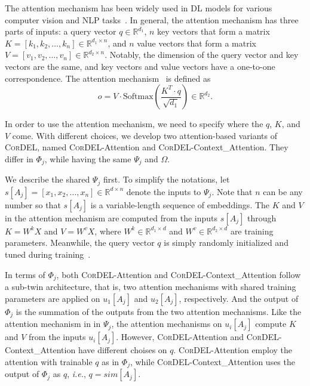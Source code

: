 \documentclass[conference]{IEEEtran}
\begin{document}
The attention mechanism has been widely used in DL models for various computer vision and NLP tasks~\cite{yang2016hierarchical,vaswani2017attention,wang2018non,devlin2019bert,wang2020non,wang2020icapsnets,liu2020global}. In general, the attention mechanism has three parts of inputs: a query vector $q \in \mathbb{R}^{d_1}$, $n$ key vectors that form a matrix $K=[k_1,k_2,\ldots,k_n] \in \mathbb{R}^{d_1 \times n}$, and $n$ value vectors that form a matrix $V=[v_1,v_2,\ldots,v_n] \in \mathbb{R}^{d_2 \times n}$. Notably, the dimension of the query vector and key vectors are the same, and key vectors and value vectors have a one-to-one correspondence. The attention mechanism~\cite{vaswani2017attention} is defined as
\begin{equation}
    o = V \cdot \text{Softmax}(\frac{K^T \cdot q}{\sqrt{d_1}}) \in \mathbb{R}^{d_2}.
\end{equation}

In order to use the attention mechanism, we need to specify where the $q$, $K$, and $V$ come. With different choices, we develop two attention-based variants of \textsc{CorDEL}, named \textsc{CorDEL}-Attention and \textsc{CorDEL}-Context\_Attention. They differ in $\Phi_j$, while having the same $\Psi_j$ and $\Omega$.

We describe the shared $\Psi_j$ first. To simplify the notations, let $s[A_j]=[x_1,x_2,\ldots,x_n] \in \mathbb{R}^{d \times n}$ denote the inputs to $\Psi_j$. Note that $n$ can be any number so that $s[A_j]$ is a variable-length sequence of embeddings. The $K$ and $V$ in the attention mechanism are computed from the inputs $s[A_j]$ through $K = W^k X$ and $V = W^v X$, where $W^k \in \mathbb{R}^{d_1 \times d}$ and $W^v \in \mathbb{R}^{d_2 \times d}$ are training parameters. Meanwhile, the query vector $q$ is simply randomly initialized and tuned during training~\cite{yang2016hierarchical}.

In terms of $\Phi_j$, both \textsc{CorDEL}-Attention and \textsc{CorDEL}-Context\_Attention follow a sub-twin architecture, that is, two attention mechanisms with shared training parameters are applied on $u_1[A_j]$ and $u_2[A_j]$, respectively. And the output of $\Phi_j$ is the summation of the outputs from the two attention mechanisms. Like the attention mechanism in in $\Psi_j$, the attention mechanisms on $u_i[A_j]$ compute $K$ and $V$ from the inputs $u_i[A_j]$. However, \textsc{CorDEL}-Attention and \textsc{CorDEL}-Context\_Attention have different choises on $q$. \textsc{CorDEL}-Attention employ the attention with trainable $q$ as in $\Phi_j$, while \textsc{CorDEL}-Context\_Attention uses the output of $\Phi_j$ as $q$, \textit{i.e.}, $q=sim[A_j]$.
\end{document}
